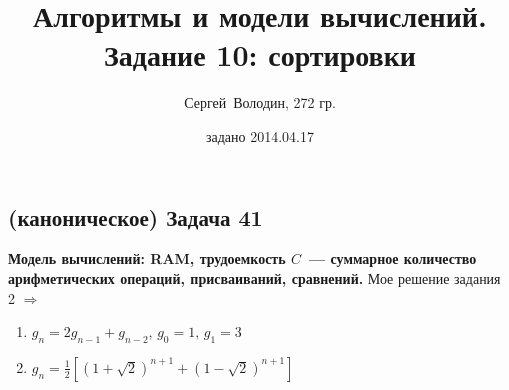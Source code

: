 \documentclass[a4paper]{article}
\date{задано 2014.04.17}
\author{Сергей~Володин, 272 гр.}
\title{Алгоритмы и модели вычислений.\\Задание 10: сортировки}
\begin{document}
\maketitle
\subsection*{(каноническое) Задача 41}
{\bf Модель вычислений: RAM, трудоемкость $C$~--- суммарное количество арифметических операций, присваиваний, сравнений.}\newline
Мое решение задания 2 $\Rightarrow$ \begin{enumerate}
\item \label{41GnRec} $g_n = 2g_{n-1} + g_{n-2}$, $g_0=1,\,g_1=3$
\item \label{41Gn2} $g_n=\frac{1}{2}\left[(1+\sqrt{2})^{n+1}+(1-\sqrt{2})^{n+1}\right]$
\end{enumerate}
\end{document}
